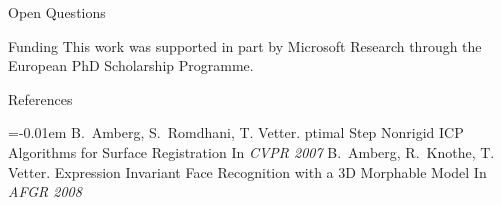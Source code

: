 \documentclass[a0paper,landscape,final]{baposter}
\begin{document}
\begin{poster}
\begin{posterbox}[name=questions,column=2,span=1,above=bottom,below=results]{Open Questions}
  \end{posterbox}%
  \begin{posterbox}[name=funding,column=3,span=1,above=bottom]{Funding}
  \smaller 
  This work was supported in part by Microsoft Research through the European PhD Scholarship Programme.
  \end{posterbox}%
  \begin{posterbox}[name=references,column=3,above=funding,below=results]{References}
    \smaller
    \vspace{-0.4em}
    
    \renewcommand{\section}[2]{\vskip 0.05em}
      \begin{thebibliography}{1}\itemsep=-0.01em
      \setlength{\baselineskip}{0.4em}
        B.~Amberg, S.~Romdhani, T. Vetter.
        ptimal {S}tep {N}onrigid {ICP} {A}lgorithms for {S}urface {R}egistration
        \newblock In {\em CVPR 2007}
        B.~Amberg, R.~Knothe, T. Vetter.
        \newblock Expression Invariant Face Recognition with a 3D Morphable Model
        \newblock In {\em AFGR 2008}
      \end{thebibliography}
  \end{posterbox}%
\end{poster}%
%
\end{document}
